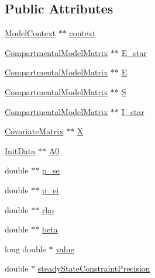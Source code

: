 \subsection*{Public Attributes}
\begin{DoxyCompactItemize}
\item 
\hyperlink{classSpatialSEIR_1_1ModelContext}{Model\-Context} $\ast$$\ast$ \hyperlink{classSpatialSEIR_1_1FC__E__Star_ad33f047de633b3863f4aed39985b8334}{context}
\item 
\hyperlink{classSpatialSEIR_1_1CompartmentalModelMatrix}{Compartmental\-Model\-Matrix} $\ast$$\ast$ \hyperlink{classSpatialSEIR_1_1FC__E__Star_ae58ad8d1ed674c67bad9b82d9a440788}{E\-\_\-star}
\item 
\hyperlink{classSpatialSEIR_1_1CompartmentalModelMatrix}{Compartmental\-Model\-Matrix} $\ast$$\ast$ \hyperlink{classSpatialSEIR_1_1FC__E__Star_a63da3f44898801dda49332e09f6fe693}{E}
\item 
\hyperlink{classSpatialSEIR_1_1CompartmentalModelMatrix}{Compartmental\-Model\-Matrix} $\ast$$\ast$ \hyperlink{classSpatialSEIR_1_1FC__E__Star_afe0fc0e4356629d5662f72b8d01f8ac0}{S}
\item 
\hyperlink{classSpatialSEIR_1_1CompartmentalModelMatrix}{Compartmental\-Model\-Matrix} $\ast$$\ast$ \hyperlink{classSpatialSEIR_1_1FC__E__Star_ab529083fb9708dd102ac8391ba58013f}{I\-\_\-star}
\item 
\hyperlink{classSpatialSEIR_1_1CovariateMatrix}{Covariate\-Matrix} $\ast$$\ast$ \hyperlink{classSpatialSEIR_1_1FC__E__Star_adbf6bb013ffffb641ab5bf08a86543d1}{X}
\item 
\hyperlink{classSpatialSEIR_1_1InitData}{Init\-Data} $\ast$$\ast$ \hyperlink{classSpatialSEIR_1_1FC__E__Star_acc74a218a4ecb0a8df09ac2ff18c7ad9}{A0}
\item 
double $\ast$$\ast$ \hyperlink{classSpatialSEIR_1_1FC__E__Star_ae0ae48d8ad6555fd6696262081e07616}{p\-\_\-se}
\item 
double $\ast$$\ast$ \hyperlink{classSpatialSEIR_1_1FC__E__Star_aaef4ec5542c0fe3d5794571239d3b783}{p\-\_\-ei}
\item 
double $\ast$$\ast$ \hyperlink{classSpatialSEIR_1_1FC__E__Star_ab44e7a5fd2d1332a5d09358f75ddc7f5}{rho}
\item 
double $\ast$$\ast$ \hyperlink{classSpatialSEIR_1_1FC__E__Star_a941f42721f292ccf0696d890e1805301}{beta}
\item 
long double $\ast$ \hyperlink{classSpatialSEIR_1_1FC__E__Star_a7e134b73759fab72fa936f7bf0ec16cd}{value}
\item 
double $\ast$ \hyperlink{classSpatialSEIR_1_1FC__E__Star_a2ef0148996094e8ca63ef706298688b6}{steady\-State\-Constraint\-Precision}
\end{DoxyCompactItemize}


